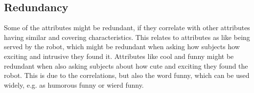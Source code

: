 \subsection{Redundancy}
%
Some of the attributes might be redundant, if they correlate with other attributes having similar and covering characteristics. This relates to attributes as like being served by the robot, which might be redundant when asking how subjects how exciting and intrusive they found it. Attributes like cool and funny might be redundant when also asking subjects about how cute and exciting they found the robot. This is due to the correlations, but also the word funny, which can be used widely, e.g. as humorous funny or wierd funny. 
